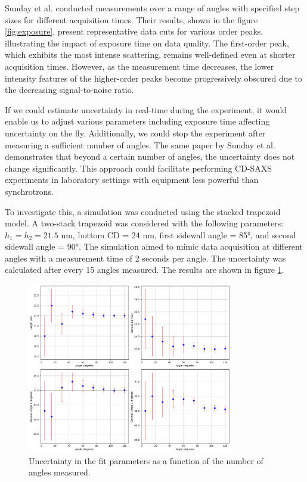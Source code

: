 Sunday et al. conducted measurements over a range of angles with specified step sizes for different 
acquisition times. Their results, shown in the figure \ref{fig:exposure}, present representative data cuts for various 
order peaks, illustrating the impact of exposure time on data quality. The first-order peak, which 
exhibits the most intense scattering, remains well-defined even at shorter acquisition times. However, 
as the measurement time decreases, the lower intensity features of the higher-order peaks become 
progressively obscured due to the decreasing signal-to-noise ratio.

If we could estimate uncertainty in real-time during the experiment, it would enable us to adjust 
various parameters including exposure time affecting uncertainty on the fly. Additionally, we could stop the experiment 
after measuring a sufficient number of angles. The same paper by Sunday et al. demonstrates that 
beyond a certain number of angles, the uncertainty does not change significantly. This approach 
could facilitate performing CD-SAXS experiments in laboratory settings with equipment less powerful 
than synchrotrons.

To investigate this, a simulation was conducted using the stacked trapezoid model. A two-stack 
trapezoid was considered with the following parameters: \( h_{1} = h_{2} = 21.5 \) nm, bottom CD = 24 nm, 
first sidewall angle = 85°, and second sidewall angle = 90°. The simulation aimed to mimic 
data acquisition at different angles with a measurement time of 2 seconds per angle. The uncertainty 
was calculated after every 15 angles measured. The results are shown in figure \ref{fig:uncertainity}.

\begin{figure}[h]
\centering
\includegraphics[width=0.8\textwidth]{images/uncertainity.png}
\caption{Uncertainty in the fit parameters as a function of the number of angles measured.}
\label{fig:uncertainity}
\end{figure}

